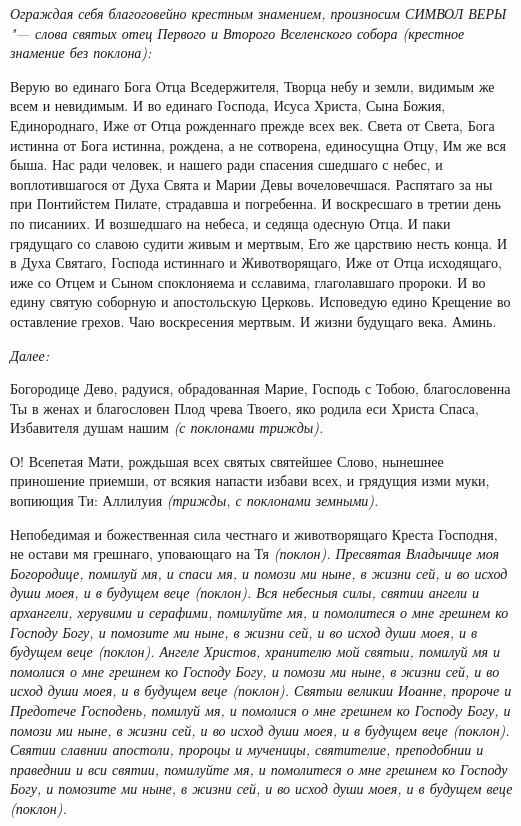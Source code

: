 \medskip


\itshape Ограждая себя благоговейно крестным знамением, произносим СИМВОЛ ВЕРЫ "--- слова святых отец Первого и Второго Вселенского собора (крестное знамение без поклона): \normalfont{}


\medskip


Верую во единаго Бога Отца Вседержителя, Творца небу и земли, видимым же всем и невидимым. И во единаго Господа, Исуса Христа, Сына Божия, Единороднаго, Иже от Отца рожденнаго прежде всех век. Света от Света, Бога истинна от Бога истинна, рождена, а не сотворена, единосущна Отцу, Им же вся быша. Нас ради человек, и нашего ради спасения сшедшаго с небес, и воплотившагося от Духа Свята и Марии Девы вочеловечшася. Распятаго за ны при Понтийстем Пилате, страдавша и погребенна. И воскресшаго в третии день по писаниих. И возшедшаго на небеса, и седяща одесную Отца. И паки грядущаго со славою судити живым и мертвым, Его же царствию несть конца. И в Духа Святаго, Господа истиннаго и Животворящаго, Иже от Отца исходящаго, иже со Отцем и Сыном споклоняема и сславима, глаголавшаго пророки. И во едину святую соборную и апостольскую Церковь. Исповедую едино Крещение во оставление грехов. Чаю воскресения мертвым. И жизни будущаго века. Аминь.


\medskip


\itshape Далее: \normalfont{}


Богородице Дево, радуися, обрадованная Марие, Господь с Тобою, благословенна Ты в женах и благословен Плод чрева Твоего, яко родила еси Христа Спаса, Избавителя душам нашим \itshape (с поклонами трижды)\normalfont{}.


О! Всепетая Мати, рождьшая всех святых святейшее Слово, нынешнее приношение приемши, от всякия напасти избави всех, и грядущия изми муки, вопиющия Ти: Аллилуия \itshape (трижды, с поклонами земными)\normalfont{}.


Непобедимая и божественная сила честнаго и животворящаго Креста Господня, не остави мя грешнаго, уповающаго на Тя \itshape (поклон)\normalfont{}. Пресвятая Владычице моя Богородице, помилуй мя, и спаси мя, и помози ми ныне, в жизни сей, и во исход души моея, и в будущем веце \itshape (поклон)\normalfont{}. Вся небесныя силы, святии ангели и архангели, херувими и серафими, помилуйте мя, и помолитеся о мне грешнем ко Господу Богу, и помозите ми ныне, в жизни сей, и во исход души моея, и в будущем веце \itshape (поклон)\normalfont{}. Ангеле Христов, хранителю мой святыи, помилуй мя и помолися о мне грешнем ко Господу Богу, и помози ми ныне, в жизни сей, и во исход души моея, и в будущем веце \itshape (поклон)\normalfont{}. Святыи великии Иоанне, пророче и Предотече Господень, помилуй мя, и помолися о мне грешнем ко Господу Богу, и помози ми ныне, в жизни сей, и во исход души моея, и в будущем веце \itshape (поклон)\normalfont{}. Святии славнии апостоли, пророцы и мученицы, святителие, преподобнии и праведнии и вси святии, помилуйте мя, и помолитеся о мне грешнем ко Господу Богу, и помозите ми ныне, в жизни сей, и во исход души моея, и в будущем веце \itshape (поклон)\normalfont{}. 


